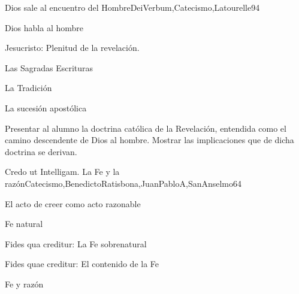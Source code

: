 \begin{syllabus}
\begin{unit}{Dios sale al encuentro del Hombre}{DeiVerbum,Catecismo,Latourelle}{9}{4}
\begin{topics}
      \item Dios habla al hombre
      \item Jesucristo: Plenitud de la revelación.
      \item Las Sagradas Escrituras
      \item La Tradición
      \item La sucesión apostólica
\end{topics}

\begin{learningoutcomes}
      \item Presentar al alumno la doctrina católica de la Revelación,  entendida como el camino descendente de Dios al hombre.
Mostrar las implicaciones que de dicha doctrina se derivan.
\end{learningoutcomes}
\end{unit}

\begin{unit}{Credo ut Intelligam. La Fe y la razón}{Catecismo,BenedictoRatisbona,JuanPabloA,SanAnselmo}{6}{4}
\begin{topics}
      \item El acto de creer como acto razonable
      \item Fe natural 
      \item Fides qua creditur: La Fe sobrenatural
      \item Fides quae creditur: El contenido de la Fe
      \item Fe y razón

\end{topics}

\begin{learningoutcomes}
      \item 
\end{learningoutcomes}
\end{unit}


\end{syllabus}
